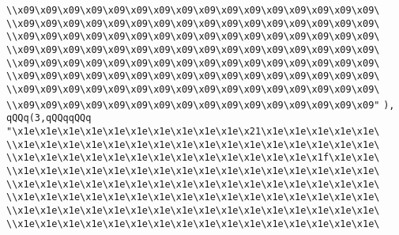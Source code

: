 \verb|\\x09\x09\x09\x09\x09\x09\x09\x09\x09\x09\x09\x09\x09\x09\x09\x09\|\newline
\verb|\\x09\x09\x09\x09\x09\x09\x09\x09\x09\x09\x09\x09\x09\x09\x09\x09\|\newline
\verb|\\x09\x09\x09\x09\x09\x09\x09\x09\x09\x09\x09\x09\x09\x09\x09\x09\|\newline
\verb|\\x09\x09\x09\x09\x09\x09\x09\x09\x09\x09\x09\x09\x09\x09\x09\x09\|\newline
\verb|\\x09\x09\x09\x09\x09\x09\x09\x09\x09\x09\x09\x09\x09\x09\x09\x09\|\newline
\verb|\\x09\x09\x09\x09\x09\x09\x09\x09\x09\x09\x09\x09\x09\x09\x09\x09\|\newline
\verb|\\x09\x09\x09\x09\x09\x09\x09\x09\x09\x09\x09\x09\x09\x09\x09\x09\|\newline
\verb|\\x09\x09\x09\x09\x09\x09\x09\x09\x09\x09\x09\x09\x09\x09\x09\x09"|\newline
\verb|),|\newline
\verb|qQQq(3,qQQqqQQq|\newline
\verb|"\x1e\x1e\x1e\x1e\x1e\x1e\x1e\x1e\x1e\x1e\x21\x1e\x1e\x1e\x1e\x1e\|\newline
\verb|\\x1e\x1e\x1e\x1e\x1e\x1e\x1e\x1e\x1e\x1e\x1e\x1e\x1e\x1e\x1e\x1e\|\newline
\verb|\\x1e\x1e\x1e\x1e\x1e\x1e\x1e\x1e\x1e\x1e\x1e\x1e\x1e\x1f\x1e\x1e\|\newline
\verb|\\x1e\x1e\x1e\x1e\x1e\x1e\x1e\x1e\x1e\x1e\x1e\x1e\x1e\x1e\x1e\x1e\|\newline
\verb|\\x1e\x1e\x1e\x1e\x1e\x1e\x1e\x1e\x1e\x1e\x1e\x1e\x1e\x1e\x1e\x1e\|\newline
\verb|\\x1e\x1e\x1e\x1e\x1e\x1e\x1e\x1e\x1e\x1e\x1e\x1e\x1e\x1e\x1e\x1e\|\newline
\verb|\\x1e\x1e\x1e\x1e\x1e\x1e\x1e\x1e\x1e\x1e\x1e\x1e\x1e\x1e\x1e\x1e\|\newline
\verb|\\x1e\x1e\x1e\x1e\x1e\x1e\x1e\x1e\x1e\x1e\x1e\x1e\x1e\x1e\x1e\x1e\|\newline
